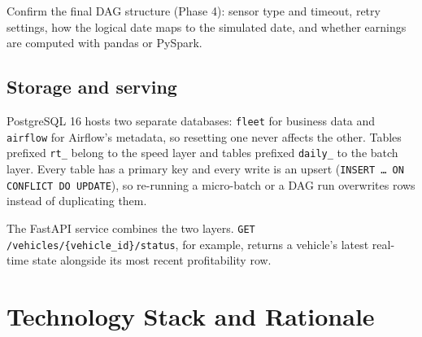 \documentclass[11pt,a4paper]{article}
\newcommand{\code}[1]{\texttt{\small #1}}
\newcommand{\tocomplete}[1]{%
  \begin{tcolorbox}[colback=orange!6,colframe=orange!70!black,
    title=To complete (evidence from the running system),fonttitle=\bfseries\small,
    boxrule=0.6pt,arc=1mm]\small #1\end{tcolorbox}}
\begin{document}
\tocomplete{Confirm the final DAG structure (Phase 4): sensor type and timeout, retry settings,
how the logical date maps to the simulated date, and whether earnings are computed with pandas or
PySpark.}

\subsection{Storage and serving}

PostgreSQL 16 hosts two separate databases: \code{fleet} for business data and \code{airflow} for
Airflow's metadata, so resetting one never affects the other. Tables prefixed \code{rt\_} belong to
the speed layer and tables prefixed \code{daily\_} to the batch layer. Every table has a primary
key and every write is an upsert (\code{INSERT \ldots{} ON CONFLICT DO UPDATE}), so re-running a
micro-batch or a DAG run overwrites rows instead of duplicating them.

The FastAPI service combines the two layers. \code{GET /vehicles/\{vehicle\_id\}/status}, for
example, returns a vehicle's latest real-time state alongside its most recent profitability row.

\section{Technology Stack and Rationale}
\end{document}
